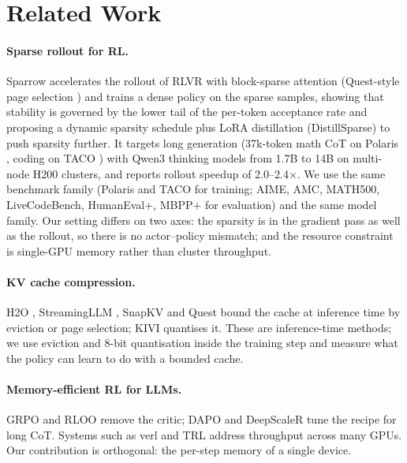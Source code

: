\section{Related Work}
\label{sec:related}

\paragraph{Sparse rollout for RL.}
Sparrow \citep{sadhukhan2026sparrow} accelerates the rollout of RLVR with
block-sparse attention (Quest-style page selection \citep{tang2024quest}) and
trains a dense policy on the sparse samples, showing that stability is
governed by the lower tail of the per-token acceptance rate and proposing a
dynamic sparsity schedule plus LoRA distillation (DistillSparse) to push
sparsity further. It targets long generation (37k-token math CoT on Polaris
\citep{an2025polaris}, coding on TACO \citep{li2023taco}) with Qwen3 thinking
models from 1.7B to 14B on multi-node H200 clusters, and reports rollout
speedup of 2.0--2.4$\times$. We use the same benchmark family (Polaris and
TACO for training; AIME, AMC, MATH500, LiveCodeBench, HumanEval+, MBPP+ for
evaluation) and the same model family. Our setting differs on two axes: the
sparsity is in the gradient pass as well as the rollout, so there is no
actor--policy mismatch; and the resource constraint is single-GPU memory
rather than cluster throughput. 

\paragraph{KV cache compression.}
H2O \citep{zhang2023h2o}, StreamingLLM \citep{xiao2024streamingllm}, SnapKV
\citep{li2024snapkv} and Quest \citep{tang2024quest} bound the cache at
inference time by eviction or page selection; KIVI \citep{liu2024kivi}
quantises it. These are inference-time methods; we use eviction and 8-bit
quantisation inside the training step and measure what the policy can learn
to do with a bounded cache.

\paragraph{Memory-efficient RL for LLMs.}
GRPO \citep{shao2024grpo} and RLOO \citep{ahmadian2024rloo} remove the critic;
DAPO \citep{yu2025dapo} and DeepScaleR \citep{luo2025deepscaler} tune the
recipe for long CoT. Systems such as verl \citep{sheng2025verl} and TRL
\citep{vonwerra2020trl} address throughput across many GPUs. Our contribution
is orthogonal: the per-step memory of a single device.

